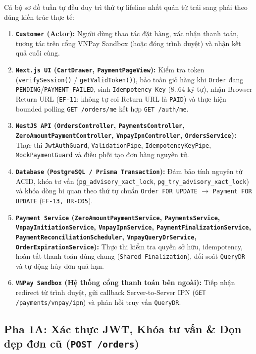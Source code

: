 Cả bộ sơ đồ tuần tự đều duy trì thứ tự lifeline nhất quán từ trái sang phải theo đúng kiến trúc thực tế:
\begin{enumerate}
  \item \textbf{\texttt{Customer} (Actor):} Người dùng thao tác đặt hàng, xác nhận thanh toán, tương tác trên cổng VNPay Sandbox (hoặc đóng trình duyệt) và nhận kết quả cuối cùng.
  \item \textbf{\texttt{Next.js UI} (\texttt{CartDrawer}, \texttt{PaymentPageView}):} Kiểm tra token (\texttt{verifySession()} / \texttt{getValidToken()}), bảo toàn giỏ hàng khi \texttt{Order} đang \texttt{PENDING}/\texttt{PAYMENT\_FAILED}, sinh \texttt{Idempotency-Key} (8..64 ký tự), nhận Browser Return URL (\texttt{EF-11}: không tự coi Return URL là \texttt{PAID}) và thực hiện bounded polling \texttt{GET /orders/me} kết hợp \texttt{GET /auth/me}.
  \item \textbf{\texttt{NestJS API} (\texttt{OrdersController}, \texttt{PaymentsController}, \texttt{ZeroAmountPaymentController}, \texttt{VnpayIpnController}, \texttt{OrdersService}):} Thực thi \texttt{JwtAuthGuard}, \texttt{ValidationPipe}, \texttt{IdempotencyKeyPipe}, \texttt{MockPaymentGuard} và điều phối tạo đơn hàng nguyên tử.
  \item \textbf{\texttt{Database} (\texttt{PostgreSQL / Prisma Transaction}):} Đảm bảo tính nguyên tử ACID, khóa tư vấn (\texttt{pg\_advisory\_xact\_lock}, \texttt{pg\_try\_advisory\_xact\_lock}) và khóa dòng bi quan theo thứ tự chuẩn \texttt{Order FOR UPDATE} $\rightarrow$ \texttt{Payment FOR UPDATE} (\texttt{EF-13, BR-C05}).
  \item \textbf{\texttt{Payment Service} (\texttt{ZeroAmountPaymentService}, \texttt{PaymentsService}, \texttt{VnpayInitiationService}, \texttt{VnpayIpnService}, \texttt{PaymentFinalizationService}, \texttt{PaymentReconciliationScheduler}, \texttt{VnpayQueryDrService}, \texttt{OrderExpirationService}):} Thực thi kiểm tra quyền sở hữu, idempotency, hoàn tất thanh toán dùng chung (\texttt{Shared Finalization}), đối soát \texttt{QueryDR} và tự động hủy đơn quá hạn.
  \item \textbf{\texttt{VNPay Sandbox} (Hệ thống cổng thanh toán bên ngoài):} Tiếp nhận redirect từ trình duyệt, gửi callback Server-to-Server IPN (\texttt{GET /payments/vnpay/ipn}) và phản hồi truy vấn \texttt{QueryDR}.
\end{enumerate}

\subsection{Pha 1A: Xác thực JWT, Khóa tư vấn \& Dọn dẹp đơn cũ (\texttt{POST /orders})}

